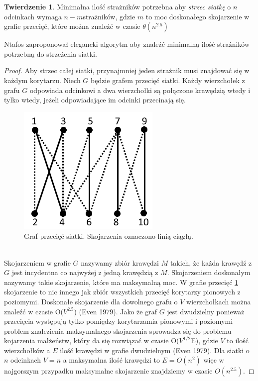\documentclass[brudnopis]{xmgr}
\theoremstyle{definition}
\newtheorem{Twierdzenie}{Twierdzenie}
\begin{document}
\begin{Twierdzenie}\cite{ntafos}
	Minimalna ilość strażników potrzebna aby \emph{strzec siatkę} o $n$ odcinkach wymaga $n - m$strażników, gdzie $m$ to moc doskonałego skojarzenie w grafie przecięć, które można znaleźć w czasie $\theta(n^{2.5})$
\end{Twierdzenie}
Ntafos zaproponował elegancki algorytm aby znaleźć minimalną ilość strażników potrzebną do strzeżenia siatki.
\begin{proof}
Aby strzec całej siatki, przynajmniej jeden strażnik musi znajdować się w każdym korytarzu. Niech $G$ będzie grafem przecięć siatki. Każdy wierzchołek z grafu $G$ odpowiada odcinkowi a dwa wierzchołki są połączone krawędzią wtedy i tylko wtedy, jeżeli odpowiadające im odcinki przecinają się.
 \begin{figure}[ht!]
   \centering
   \includegraphics{rysunki/graf_skojarzen.png}
   \caption{Graf przecięć siatki. Skojarzenia oznaczono linią ciągłą.}
   \label{fig:graf przeciec}
 \end{figure} 
 \\Skojarzeniem w grafie $G$ nazywamy zbiór krawędzi $M$ takich, że każda krawędź z $G$ jest incydentna co najwyżej z jedną krawędzią z $M$. Skojarzeniem doskonałym nazywamy takie skojarzenie, które ma maksymalną moc. W grafie przecięć \ref{fig:graf przeciec} skojarzenie to nic innego jak zbiór wszystkich przecięć korytarzy pionowych z poziomymi. Doskonałe skojarzenie dla dowolnego grafu o $V$ wierzchołkach można znaleźć w czasie O($V^{2.5}$) (Even 1979). Jako że graf $G$ jest dwudzielny ponieważ przecięcia występują tylko pomiędzy korytarzamia pionowymi i poziomymi problem znalezienia maksymalnego skojarzenia sprowadza się do problemu kojarzenia małżeństw, który da się rozwiązać w czasie O($V^{1/2}$E), gdzie $V$ to ilość wierzchołków a $E$ ilość krawędzi w grafie dwudzielnym (Even 1979). Dla siatki o $n$ odcinkach $V = n$ a maksymalna ilość krawędzi to $E = O(n^2)$ więc w najgorszym przypadku maksymalne skojarzenie znajdziemy w czasie $O(n^{2.5})$.

\end{proof}
\end{document}
